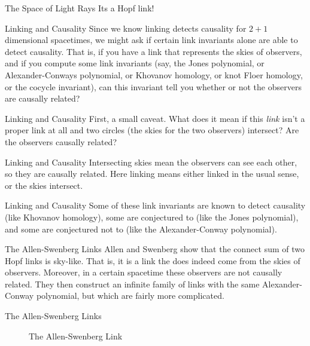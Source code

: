 \documentclass{beamer}
\begin{document}
    \begin{frame}{The Space of Light Rays}
        Its a Hopf link!
    \end{frame}
    \begin{frame}{Linking and Causality}
        Since we know linking detects causality for $2+1$ dimensional
        spacetimes, we might ask if certain link invariants alone are able
        to detect causality. That is, if you have a link that represents
        the skies of observers, and if you compute some link invariants
        (say, the Jones polynomial, or Alexander-Conways polynomial, or
        Khovanov homology, or knot Floer homology, or the cocycle invariant),
        can this invariant tell you whether or not the observers are causally
        related?
    \end{frame}
    \begin{frame}{Linking and Causality}
        First, a small caveat. What does it mean if this \textit{link}
        isn't a proper link at all and two circles (the skies for the
        two observers) intersect? Are the observers causally related?
    \end{frame}
    \begin{frame}{Linking and Causality}
        Intersecting skies mean the observers can see each other, so they
        are causally related. Here linking means either linked in the usual
        sense, or the skies intersect.
    \end{frame}
    \begin{frame}{Linking and Causality}
        Some of these link invariants are known to detect causality
        (like Khovanov homology), some are conjectured to
        (like the Jones polynomial), and some are conjectured not to
        (like the Alexander-Conway polynomial).
    \end{frame}
    \begin{frame}{The Allen-Swenberg Links}
        Allen and Swenberg show that the connect sum of two Hopf links is
        sky-like. That is, it is a link the does indeed come from the skies
        of observers. Moreover, in a certain spacetime these observers are
        not causally related. They then construct an infinite family of links
        with the same Alexander-Conway polynomial, but which are fairly
        more complicated.
    \end{frame}
    \begin{frame}{The Allen-Swenberg Links}
        \begin{figure}
            \centering
            \caption{The Allen-Swenberg Link}
        \end{figure}
    \end{frame}
\end{document}
